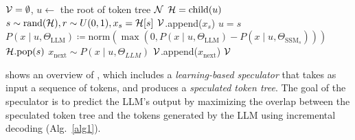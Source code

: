 \begin{algorithm}
\begin{algorithmic}[1]
\State $\mathcal{V} = \emptyset$, $u \leftarrow$ the root of token tree $\mathcal{N}$
\State $\mathcal{H} = \textrm{child}(u)$
\Comment{\textcolor{violet}{The set of child nodes for $u$}}
    \State $s\sim \textrm{rand}(\mathcal{H}), r \sim U(0, 1), x_s=\mathcal{H}[s]$ 
            \LineComment{\textcolor{violet}{Token $x_s$ passes verification.}}
            \State $\mathcal{V}$.append($x_s$)
            \State $u = s$
        \Else            
            \State $P(x \mid u, \Theta_{\textrm{LLM}})\coloneqq \textrm{norm}(\max(0, P(x \mid u, \Theta_{\textrm{LLM}})-P(x \mid u, \Theta_{\textrm{SSM}_s})))$ 
            \State $\mathcal{H}.\textrm{pop}(s)$
        \EndIf   
    \EndWhile
{}
\EndIf
\EndWhile
{}
\State $x_{\textrm{next}} \sim P(x \mid u, \Theta_{LLM})$
\State $\mathcal{V}$.append($x_{\textrm{next}}$)
 $\mathcal{V}$

\EndFunction
\end{algorithmic}
\end{algorithm}

 shows an overview of \sys, which
includes a {\em learning-based speculator} that takes as input a sequence of tokens, and produces a {\em speculated token tree}.
The goal of the speculator is to predict the LLM's output by maximizing the overlap between the speculated token tree and the tokens generated by the LLM using incremental decoding (Alg.~\ref{alg1}).

